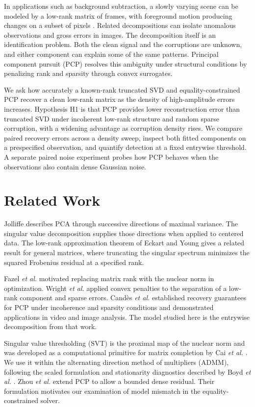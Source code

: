 \documentclass[conference]{IEEEtran}
\begin{document}
In applications such as background subtraction, a slowly varying scene can be modeled by a low-rank matrix of frames, with foreground motion producing changes on a subset of pixels \cite{candes2011}. Related decompositions can isolate anomalous observations and gross errors in images. The decomposition itself is an identification problem. Both the clean signal and the corruptions are unknown, and either component can explain some of the same patterns. Principal component pursuit (PCP) resolves this ambiguity under structural conditions by penalizing rank and sparsity through convex surrogates.

We ask how accurately a known-rank truncated SVD and equality-constrained PCP recover a clean low-rank matrix as the density of high-amplitude errors increases. Hypothesis H1 is that PCP provides lower reconstruction error than truncated SVD under incoherent low-rank structure and random sparse corruption, with a widening advantage as corruption density rises. We compare paired recovery errors across a density sweep, inspect both fitted components on a prespecified observation, and quantify detection at a fixed entrywise threshold. A separate paired noise experiment probes how PCP behaves when the observations also contain dense Gaussian noise.

\section{Related Work}
Jolliffe \cite{jolliffe2002} describes PCA through successive directions of maximal variance. The singular value decomposition supplies those directions when applied to centered data. The low-rank approximation theorem of Eckart and Young \cite{eckart1936} gives a related result for general matrices, where truncating the singular spectrum minimizes the squared Frobenius residual at a specified rank.

Fazel \emph{et al.} \cite{fazel2001} motivated replacing matrix rank with the nuclear norm in optimization. Wright \emph{et al.} \cite{wright2009} applied convex penalties to the separation of a low-rank component and sparse errors. Cand\`es \emph{et al.} \cite{candes2011} established recovery guarantees for PCP under incoherence and sparsity conditions and demonstrated applications in video and image analysis. The model studied here is the entrywise decomposition from that work.

Singular value thresholding (SVT) is the proximal map of the nuclear norm and was developed as a computational primitive for matrix completion by Cai \emph{et al.} \cite{cai2010}. We use it within the alternating direction method of multipliers (ADMM), following the scaled formulation and stationarity diagnostics described by Boyd \emph{et al.} \cite{boyd2011}. Zhou \emph{et al.} \cite{zhou2010} extend PCP to allow a bounded dense residual. Their formulation motivates our examination of model mismatch in the equality-constrained solver.
\end{document}
